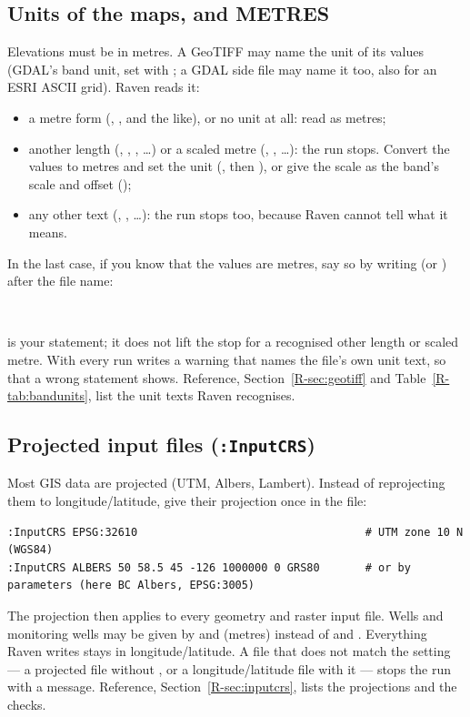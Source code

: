 \subsection{Units of the maps, and METRES}\label{sec:umetres}
Elevations must be in metres. A GeoTIFF may name the unit of its values (GDAL's band unit, set with
; a GDAL side file  may name it too, also for an ESRI ASCII grid). Raven reads it:
\begin{itemize}
\item a metre form (, ,  and the like), or no unit at all: read as metres;
\item another length (, , , \dots) or a scaled metre (,
, \dots): the run stops. Convert the values to metres and set the unit (, then
), or give the scale as the band's scale and offset ();
\item any other text (, , \dots): the run stops too, because Raven cannot tell
what it means.
\end{itemize}
In the last case, if you know that the values are metres, say so by writing  (or ) after the file
name:
\begin{whattowrite}
\\
\end{whattowrite}
 is your statement; it does not lift the stop for a recognised other length or scaled metre. With
 every run writes a warning that names the file's own unit text, so that a wrong statement shows. Reference,
Section~\ref{R-sec:geotiff} and Table~\ref{R-tab:bandunits}, list the unit texts Raven recognises.

\subsection{Projected input files (\texttt{:InputCRS})}\label{sec:uinputcrs}
Most GIS data are projected (UTM, Albers, Lambert). Instead of reprojecting them to longitude/latitude, give their
projection once in the  file:
\begin{lstlisting}
:InputCRS EPSG:32610                                   # UTM zone 10 N (WGS84)
:InputCRS ALBERS 50 58.5 45 -126 1000000 0 GRS80       # or by parameters (here BC Albers, EPSG:3005)
\end{lstlisting}
The projection then applies to every geometry and raster input file. Wells and monitoring wells may be given by 
and  (metres) instead of  and . Everything Raven writes stays in longitude/latitude.
A file that does not match the setting --- a projected file without , or a longitude/latitude file with it
--- stops the run with a message. Reference, Section~\ref{R-sec:inputcrs}, lists the projections and the checks.

